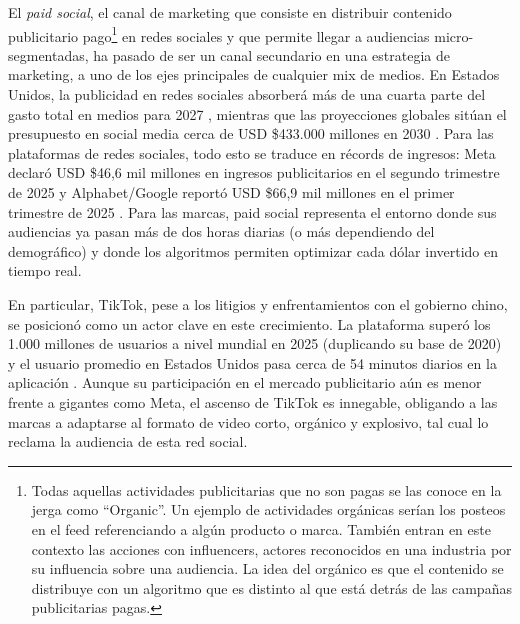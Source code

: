 \documentclass[12pt, a4paper]{report}
\begin{document}
El \textit{paid social}, el canal de marketing que consiste en distribuir contenido publicitario
pago\footnote{Todas aquellas actividades publicitarias que no son pagas se las conoce en la jerga como
``Organic''. Un ejemplo de actividades orgánicas serían los posteos en el feed referenciando a algún
producto o marca. También entran en este contexto las acciones con influencers, actores reconocidos
en una industria por su influencia sobre una audiencia. La idea del orgánico es que el contenido se
distribuye con un algoritmo que es distinto al que está detrás de las campañas publicitarias pagas.}
en redes sociales y que permite llegar a audiencias micro-segmentadas, ha
pasado de ser un canal secundario en una estrategia de marketing, a uno de los
ejes principales de cualquier mix de medios. En Estados Unidos, la publicidad en redes
sociales absorberá más de una cuarta parte del gasto total en medios para 2027
\citep{emarketer2024}, mientras que las proyecciones globales sitúan el presupuesto en 
social media cerca de USD \$433.000 millones en 2030 \citep{digitalsilk2025}.
Para las plataformas de redes sociales, todo esto se traduce en récords de
ingresos: Meta declaró USD \$46,6 mil millones en ingresos publicitarios en el
segundo trimestre de 2025 \citep{meta2025} y Alphabet/Google reportó USD \$66,9 mil
millones en el primer trimestre de 2025 \citep{schwartz2025}. Para las marcas, paid
social representa el entorno donde sus audiencias ya pasan más de dos horas
diarias (o más dependiendo del demográfico) y donde los algoritmos permiten
optimizar cada dólar invertido en tiempo real.


En particular, TikTok, pese a los litigios y enfrentamientos con el gobierno chino,
se posicionó como un actor clave en este crecimiento. La plataforma superó los
1.000 millones de usuarios a nivel mundial en 2025 (duplicando su base de 2020)
\citep{backlink2025} y el usuario promedio en Estados Unidos pasa cerca de 54 minutos
diarios en la aplicación \citep{emarketer2025}. Aunque su participación en el mercado
publicitario aún es menor frente a gigantes como Meta, el ascenso de TikTok es innegable,
obligando a las marcas a adaptarse al formato de video corto, orgánico y explosivo, tal cual
lo reclama la audiencia de esta red social.
\end{document}
